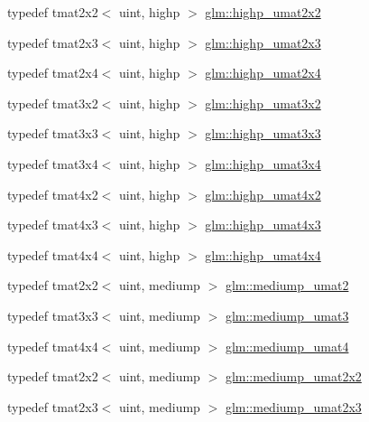 \begin{DoxyCompactItemize}
\item 
typedef tmat2x2$<$ uint, highp $>$ \hyperlink{group__gtc__matrix__integer_gaeb546847abfc7c3c09ea8172987ebb16}{glm\-::highp\-\_\-umat2x2}
\item 
typedef tmat2x3$<$ uint, highp $>$ \hyperlink{group__gtc__matrix__integer_gab058a0a12ea7f604d92baeb7a0e54f3b}{glm\-::highp\-\_\-umat2x3}
\item 
typedef tmat2x4$<$ uint, highp $>$ \hyperlink{group__gtc__matrix__integer_gafcec07e857ea0445d93680411e86482c}{glm\-::highp\-\_\-umat2x4}
\item 
typedef tmat3x2$<$ uint, highp $>$ \hyperlink{group__gtc__matrix__integer_ga7484178233773045088b42f362dade86}{glm\-::highp\-\_\-umat3x2}
\item 
typedef tmat3x3$<$ uint, highp $>$ \hyperlink{group__gtc__matrix__integer_ga770b01686af4fbbb13bbd7bd97d60fe4}{glm\-::highp\-\_\-umat3x3}
\item 
typedef tmat3x4$<$ uint, highp $>$ \hyperlink{group__gtc__matrix__integer_gaa2fb29026c9c80c7d17b5389e36d6aa7}{glm\-::highp\-\_\-umat3x4}
\item 
typedef tmat4x2$<$ uint, highp $>$ \hyperlink{group__gtc__matrix__integer_ga4015bf99a981bf271fd516f9b2cb6724}{glm\-::highp\-\_\-umat4x2}
\item 
typedef tmat4x3$<$ uint, highp $>$ \hyperlink{group__gtc__matrix__integer_gaa394320db559302e18c8b64013b8d7fb}{glm\-::highp\-\_\-umat4x3}
\item 
typedef tmat4x4$<$ uint, highp $>$ \hyperlink{group__gtc__matrix__integer_gaf5365128f6fd506442843fb5a441f385}{glm\-::highp\-\_\-umat4x4}
\item 
typedef tmat2x2$<$ uint, mediump $>$ \hyperlink{group__gtc__matrix__integer_ga85bc35173415dba31bb964c2940feeec}{glm\-::mediump\-\_\-umat2}
\item 
typedef tmat3x3$<$ uint, mediump $>$ \hyperlink{group__gtc__matrix__integer_ga953d4cb3e70d85567756b3fbcca0e9e9}{glm\-::mediump\-\_\-umat3}
\item 
typedef tmat4x4$<$ uint, mediump $>$ \hyperlink{group__gtc__matrix__integer_ga3eb3a5d85ec876ba65fad5525a5dda56}{glm\-::mediump\-\_\-umat4}
\item 
typedef tmat2x2$<$ uint, mediump $>$ \hyperlink{group__gtc__matrix__integer_gafce8777b8b0d9d7f810853b22de3be1b}{glm\-::mediump\-\_\-umat2x2}
\item 
typedef tmat2x3$<$ uint, mediump $>$ \hyperlink{group__gtc__matrix__integer_ga23dfc19249ad27dc4b02615f1d045ba1}{glm\-::mediump\-\_\-umat2x3}
\item 

\end{DoxyCompactItemize}
